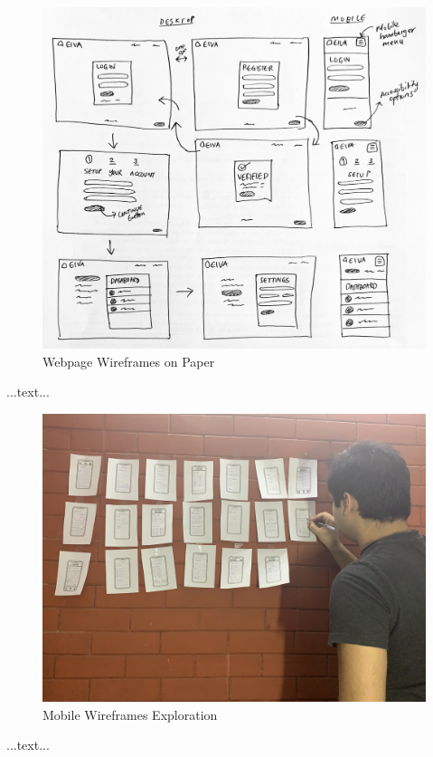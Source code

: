 \documentclass{article}
\begin{document}
\begin{figure}
  \includegraphics[width=\textwidth]{drawing-ui.jpg}
  \caption{Webpage Wireframes on Paper}
\end{figure}

...text...

\begin{figure}
  \includegraphics[width=\textwidth]{ideation-wall.jpg}
  \caption{Mobile Wireframes Exploration}
\end{figure}

...text...
\end{document}

